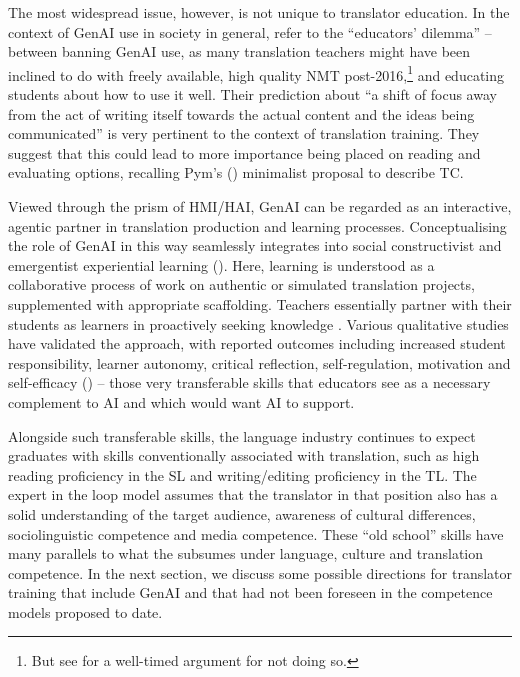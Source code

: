 \documentclass[output=paper]{langscibook}
\begin{document}
The most widespread issue, however, is not unique to translator education. In the context of GenAI use in society in general, \citet[98]{teubner_welcome_2023} refer to the “educators’ dilemma” – between banning GenAI use, as many translation teachers might have been inclined to do with freely available, high quality NMT post-2016,\footnote{ \textrm{But see \citet{mellinger_translators_2017} for a well-timed argument for not doing so.}} and educating students about how to use it well. Their prediction \citep[97]{teubner_welcome_2023} about “a shift of focus away from the act of writing itself towards the actual content and the ideas being communicated” is very pertinent to the context of translation training. They suggest that this could lead to more importance being placed on reading and evaluating options, recalling Pym's (\citeyear{pym_redefining_2003}) minimalist proposal to describe TC. 

Viewed through the prism of HMI/HAI, GenAI can be regarded as an interactive, agentic partner in translation production and learning processes. Conceptualising the role of GenAI in this way seamlessly integrates into social constructivist and emergentist experiential learning (\citealt{kiraly_social_2000,kiraly_towards_2013}). Here, learning is understood as a collaborative process of work on authentic or simulated translation projects, supplemented with appropriate scaffolding. Teachers essentially partner with their students as learners in proactively seeking knowledge \citep[214--215]{kiraly_towards_2013}. Various qualitative studies have validated the approach, with reported outcomes including increased student responsibility, learner autonomy, critical reflection, self-regulation, motivation and self-efficacy (\citealt{kiraly_towards_2013}) – those very transferable skills that educators see as a necessary complement to AI and which \citet{obrien_human-centered_2024} would want AI to support. 

Alongside such transferable skills, the language industry continues to expect graduates with skills conventionally associated with translation, such as high reading proficiency in the SL and writing/editing proficiency in the TL. The expert in the loop model \citep{slator_slator_2022} assumes that the translator in that position also has a solid understanding of the target audience, awareness of cultural differences, sociolinguistic competence and media competence. These “old school” skills have many parallels to what the \citet{emt_european_2022} subsumes under language, culture and translation competence. In the next section, we discuss some possible directions for translator training that include GenAI and that had not been foreseen in the competence models proposed to date.
\end{document}
